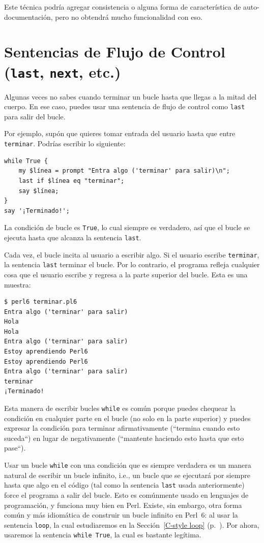 Este técnica podría agregar consistencia o alguna forma
de característica de auto-documentación, pero no obtendrá
mucho funcionalidad con eso.
 

\section{Sentencias de Flujo de Control ({\tt last}, {\tt next}, etc.)}

Algunas veces no sabes cuando terminar un bucle hasta que 
llegas a la mitad del cuerpo. En ese caso, puedes usar una
sentencia de flujo de control como {\tt last} para
salir del bucle.

Por ejemplo, supón que quieres tomar entrada del usuario hasta
que entre {\tt terminar}. Podrías escribir lo siguiente:

\begin{verbatim}
while True {
    my $línea = prompt "Entra algo ('terminar' para salir)\n";
    last if $línea eq "terminar";
    say $línea;
}
say '¡Terminado!';
\end{verbatim}
%
La condición de bucle es {\tt True}, lo cual siempre es verdadero,
así que el bucle se ejecuta hasta que alcanza la sentencia
{\tt last}.

Cada vez, el bucle incita al usuario a escribir algo.
Si el usuario escribe {\tt terminar}, la sentencia {\tt last}
terminar el bucle. Por lo contrario, el programa refleja cualquier
cosa que el usuario escribe y regresa a la parte superior del bucle.
Esta es una muestra:

\begin{verbatim}
$ perl6 terminar.pl6
Entra algo ('terminar' para salir)
Hola
Hola
Entra algo ('terminar' para salir)
Estoy aprendiendo Perl6
Estoy aprendiendo Perl6
Entra algo ('terminar' para salir)
terminar
¡Terminado!
\end{verbatim}
%
Esta manera de escribir bucles {\tt while} es común 
porque puedes chequear la condición en cualquier parte 
en el bucle (no solo en la parte superior) y puedes expresar
la condición para terminar afirmativamente (``termina cuando esto suceda``)
en lugar de negativamente (``mantente haciendo esto hasta que esto pase``).

Usar un bucle {\tt while} con una condición que es siempre
verdadera es un manera natural de escribir un bucle infinito, i.e.,
un bucle que se ejecutará por siempre hasta que algo en el 
código (tal como la sentencia {\tt last} usada anteriormente)
force el programa a salir del bucle. Esto es comúnmente usado
en lenguajes de programación, y funciona muy bien en Perl. Existe, 
sin embargo, otra forma común y más idiomática de construir
un bucle infinito en Perl~6: al usar la sentencia {\tt loop},
la cual estudiaremos en la Sección~\ref{C-style loop} 
(p.~\pageref{C-style loop}). Por ahora, usaremos la sentencia 
{\tt while True}, la cual es bastante legítima.


